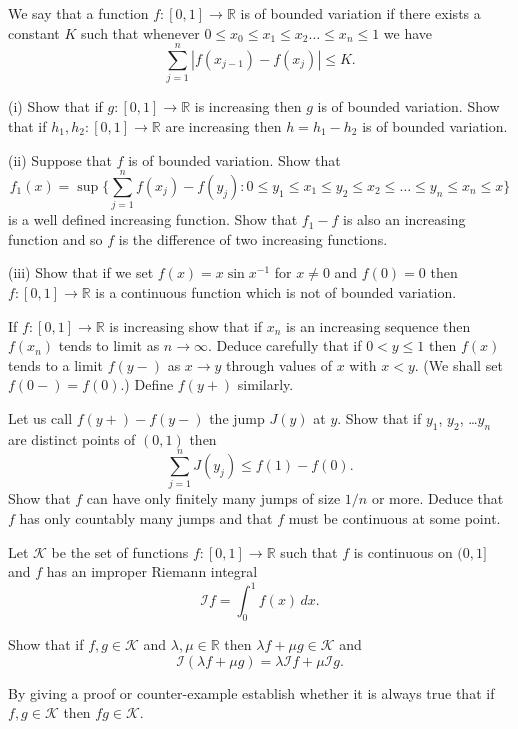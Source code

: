 \begin{question}
We say that a function $f:[0,1]\rightarrow{\mathbb R}$
is of bounded variation if there exists a constant $K$
such that whenever
$0\leq x_{0}\leq x_{1}\leq x_{2}\dots\leq x_{n}\leq 1$
we have
\[\sum_{j=1}^{n}|f(x_{j-1})-f(x_{j})|\leq K.\]

(i) Show that if $g:[0,1]\rightarrow{\mathbb R}$ is
increasing then $g$ is of bounded variation. Show that
if $h_{1},h_{2}:[0,1]\rightarrow{\mathbb R}$ are
increasing then $h=h_{1}-h_{2}$ is of bounded variation.

(ii) Suppose that $f$ is of bounded variation. Show
that
\[f_{1}(x)=\sup\{
{\textstyle \sum_{j=1}^{n}f(x_{j})-f(y_{j})}
:0\leq y_{1}\leq x_{1}\leq y_{2}\leq x_{2}\leq
\dots\leq y_{n}\leq x_{n}\leq x\}\]
is a well defined increasing function. Show
that $f_{1}-f$ is also an increasing function
and so $f$ is the difference of two increasing functions.

(iii) Show that if we set $f(x)=x\sin x^{-1}$ for
$x\neq 0$ and $f(0)=0$ then $f:[0,1]\rightarrow{\mathbb R}$
is a continuous function which is not of bounded
variation.


\end{question}
\begin{question}
If $f:[0,1]\rightarrow{\mathbb R}$ is increasing
show that if $x_{n}$ is an increasing sequence
then $f(x_{n})$ tends to limit as $n\rightarrow\infty$.
Deduce carefully that if $0<y\leq 1$ then
$f(x)$ tends to a limit $f(y-)$ as $x\rightarrow y$
through values of $x$ with $x<y$. (We shall set $f(0-)=f(0)$.)
Define $f(y+)$ similarly.

Let us call $f(y+)-f(y-)$ the jump $J(y)$ at $y$. Show
that if $y_{1}$, $y_{2}$, \dots $y_{n}$ are distinct
points of $(0,1)$ then
\[\sum_{j=1}^{n}J(y_{j})\leq f(1)-f(0).\]
Show that $f$ can have only finitely many jumps of
size $1/n$ or more. Deduce that $f$ has only
countably many jumps
and that $f$ must be continuous at some point.

\end{question}
\begin{question}
Let ${\mathcal K}$ be the set of functions
$f:[0,1]\rightarrow{\mathbb R}$ such that $f$ is continuous
on $(0,1]$ and $f$ has an improper Riemann integral
\[{\mathcal I}f=\int_{0}^{1}f(x)\,dx.\]

Show that if $f,g\in \mathcal K$ and $\lambda,\mu\in{\mathbb R}$
then $\lambda f+\mu g\in \mathcal K$ and
\[{\mathcal I}(\lambda f+\mu g)=\lambda {\mathcal I}f
+\mu {\mathcal I}g.\]

By giving a proof or counter-example establish whether
it is always true that if $f,g\in {\mathcal K}$
then $fg\in {\mathcal K}$.

\end{question}
